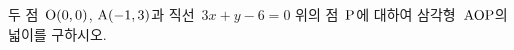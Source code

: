 두 점~$\mathrm{O}(0{,}\mkern3mu\mathopen{}0)$, $\mathrm{A}(-1{,}\mkern3mu\mathopen{}3)$과 직선~$3x+y-6=0$ 위의 점~$\mathrm{P}$에 대하여 삼각형~$\mathrm{AOP}$의 넓이를 구하시오.

